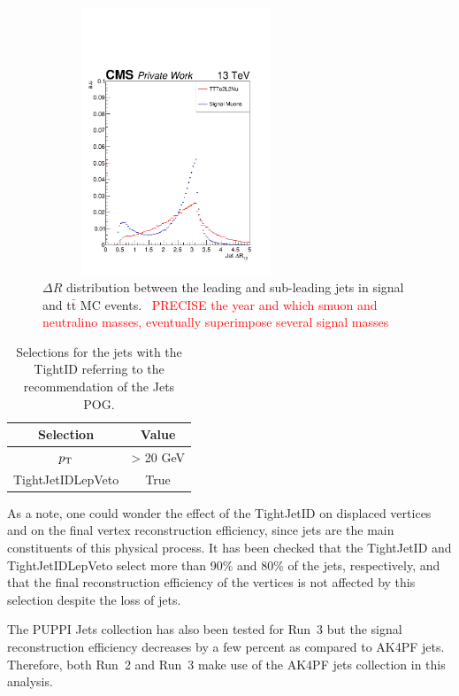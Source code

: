 \documentclass{cernatlasnote}
\newcommand{\ttbar}{t$\bar{\text{t}}$\xspace}
\newcommand{\pt}{$p_{\text T}$\xspace}
\begin{document}
\begin{appendices}
\begin{figure}[ht]
\centering
\includegraphics[height=8cm, width=8cm, trim= 0cm 0cm 0cm 0.cm,clip]{images/Jet/JetJetdR.pdf}
\caption{\label{fig:JetdR}  $\Delta R$ distribution between the leading and sub-leading jets in signal and \ttbar MC events.
~\textcolor{red}{PRECISE the year and which smuon and neutralino masses, eventually superimpose several signal masses}
}
\end{figure}
\FloatBarrier

\begin{table}[h]
\centering
    \caption{Selections for the jets with the TightID referring to the recommendation of the Jets POG\cite{TIGHTJET}.}
    \label{tab:JETSEL}
\smallskip
\begin{tabular}{cc}
  Selection & Value \\
  \hline
  \pt & > 20 GeV \\
  TightJetIDLepVeto & True \\
\end{tabular}
\end{table}

As a note, one could wonder the effect of the TightJetID on displaced vertices and on the final vertex reconstruction efficiency, since jets are the main constituents of this physical process. It has been checked that the TightJetID and TightJetIDLepVeto select more than 90\% and 80\% of the jets, respectively, and that the final reconstruction efficiency of the vertices is not affected by this selection despite the loss of jets. 

The PUPPI Jets collection has also been tested for Run~3 but the signal reconstruction efficiency decreases by a few percent as compared to AK4PF jets. Therefore, both Run~2 and Run~3 make use of the AK4PF jets collection in this analysis.



\end{appendices}
\end{document}
